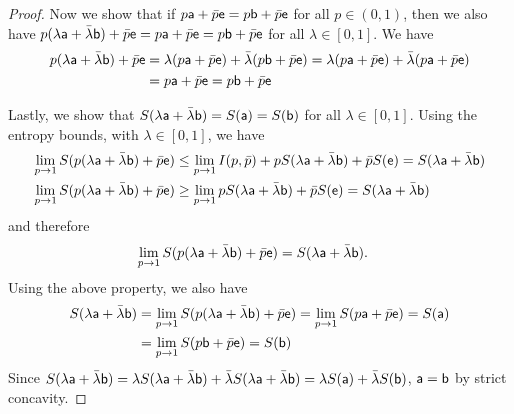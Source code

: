 \begin{proof}
	Now we show that if  $p\ens[a] + \bar{p} \ens = p \ens[b] + \bar{p} \ens$ for all $p \in (0,1)$, then we also have $p(\lambda\ens[a] + \bar{\lambda}\ens[b]) + \bar{p} \ens = p\ens[a] + \bar{p} \ens = p \ens[b] + \bar{p} \ens$ for all $\lambda \in [0,1]$. We have
	\begin{equation}
		\begin{aligned}
			p(\lambda\ens[a] + \bar{\lambda}\ens[b]) + \bar{p} \ens &= \lambda(p \ens[a] + \bar{p} \ens) + \bar{\lambda}(p\ens[b] + \bar{p} \ens) = \lambda(p \ens[a] + \bar{p} \ens) + \bar{\lambda}(p\ens[a] + \bar{p} \ens) \\
			&= p\ens[a] + \bar{p} \ens = p\ens[b] + \bar{p} \ens 
		\end{aligned}
	\end{equation}
	
	Lastly, we show that $S(\lambda \ens[a] + \bar{\lambda} \ens[b]) = S(\ens[a]) = S(\ens[b])$ for all $\lambda \in [0,1]$. Using the entropy bounds, with $\lambda \in [0,1]$, we have
	\begin{equation}
		\begin{aligned}
			\lim\limits_{p \to 1} S(p(\lambda\ens[a] + \bar{\lambda}\ens[b]) + \bar{p}\ens) &\leq \lim\limits_{p \to 1} I(p,\bar{p}) + p S(\lambda\ens[a] + \bar{\lambda}\ens[b]) + \bar{p} S(\ens) = S(\lambda\ens[a] + \bar{\lambda}\ens[b]) \\
			\lim\limits_{p \to 1} S(p(\lambda\ens[a] + \bar{\lambda}\ens[b]) + \bar{p}\ens) &\geq \lim\limits_{p \to 1} p S(\lambda\ens[a] + \bar{\lambda}\ens[b]) + \bar{p} S(\ens) = S(\lambda\ens[a] + \bar{\lambda}\ens[b])
		\end{aligned}
	\end{equation}
	and therefore
	\begin{equation}
		\begin{aligned}		
			\lim\limits_{p \to 1} S(p(\lambda\ens[a] + \bar{\lambda}\ens[b]) + \bar{p}\ens) &= S(\lambda\ens[a] + \bar{\lambda}\ens[b]).
		\end{aligned}
	\end{equation}
	Using the above property, we also have
	\begin{equation}
		\begin{aligned}
			S(\lambda\ens[a] + \bar{\lambda}\ens[b]) &= \lim\limits_{p \to 1} S(p(\lambda\ens[a] + \bar{\lambda}\ens[b]) + \bar{p}\ens) = \lim\limits_{p \to 1} S(p \ens[a] +\bar{p} \ens) = S(\ens[a]) \\
			&= \lim\limits_{p \to 1} S(p \ens[b] +\bar{p} \ens) = S(\ens[b]) \\
		\end{aligned}
	\end{equation}
	Since $S(\lambda\ens[a] + \bar{\lambda}\ens[b]) = \lambda S(\lambda\ens[a] + \bar{\lambda}\ens[b]) + \bar{\lambda} S(\lambda\ens[a] + \bar{\lambda}\ens[b]) = \lambda S(\ens[a]) + \bar{\lambda} S(\ens[b])$, $\ens[a] = \ens[b]$ by strict concavity.
\end{proof}


